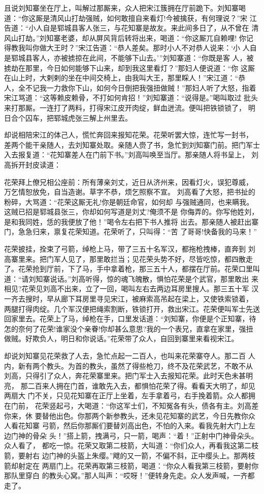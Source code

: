 且说刘知寨坐在厅上，叫解过那厮来，众人把宋江簇拥在厅前跪下。刘知寨喝
道：“你这厮是清风山打劫强贼，如何敢擅自来看灯!今被擒获，有何理说？”宋
江告道：“小人自是郓城县客人张三，与花知寨是故友。来此间多日了，从不曾在
清风山打劫。”刘知寨老婆，却从屏风背后转将出来，喝道：“你这厮兀自赖哩!
你记得教我叫你做大王时？”宋江告道：“恭人差矣。那时小人不对恭人说来：‘小
人自是郓城县客人，亦被掳掠在此间，不能够下山去。’”刘知寨道：“你既是客
人，被掳劫在那里，今日如何能够下山来，却到我这里看灯？”那妇人便说道：“你
这厮在山上时，大剌剌的坐在中间交椅上，由我叫大王，那里睬人！”宋江道：“恭
人，全不记我一力救你下山，如何今日倒把我强扭做贼！”那妇人听了大怒，指着
宋江骂道：“这等赖皮赖骨，不打如何肯招！”刘知寨道：“说得是。”喝叫取过
批头来打那厮。一连打了两料，打得宋江皮开肉绽，鲜血迸流。便叫把铁锁锁了，
明日合个囚车，把郓城虎张三解上州里去。

却说相陪宋江的体己人，慌忙奔回来报知花荣。花荣听罢大惊，连忙写一封书，
差两个能干亲随人，去刘知寨处取。亲随人赍了书，急忙到刘知寨门前。把门军士
入去报复道：“花知寨差人在门前下书。”刘高叫唤至当厅。那亲随人将书呈上，
刘高拆开封皮读道：

花荣拜上僚兄相公座前：所有薄亲刘丈，近日从济州来，因看灯火，误犯尊威，
万乞情恕放免，自当造谢。草字不恭，烦乞照察不宣。
刘高看了大怒，把书扯的粉碎，大骂道：“花荣这厮无礼!你是朝廷命官，如何却
与强贼通同，也来瞒我。这贼已招是郓城县张三，你却如何写道是刘丈?俺须不是
你侮弄的。你写他姓刘，是和我同姓，恁的我便放了他！”喝令左右把下书人推将
出去。那亲随人被赶出寨门，急急归来，禀复花荣知道。花荣听了，只叫得：“苦
了哥哥!快备我的马来！”

花荣披挂，拴束了弓箭，绰枪上马，带了三五十名军汉，都拖枪拽棒，直奔到
刘高寨里来。把门军人见了，那里敢拦当；见花荣头势不好，尽皆吃惊，都四散走
了。花荣抢到厅前，下了马，手中拿着枪，那三五十人，都摆在厅前。花荣口里叫
道：“请刘知寨说话。”刘高听得，惊的魂飞魄散，惧怕花荣是个武官，那里敢出
来相见?花荣见刘高不出来，立了一回，喝叫左右去两边耳房里搜人。那三五十军
汉一齐去搜时，早从廊下耳房里寻见宋江，被麻索高吊起在梁上，又使铁索锁着，
两腿打得肉绽。几个军汉便把绳索割断，铁锁打开，救出宋江。花荣便叫军士先送
回家里去。花荣上了马，绰枪在手，口里发话道：“刘知寨，你便是个正知寨，待
怎的奈何了花荣!谁家没个亲眷!你却甚么意思?我的一个表兄，直拿在家里，强扭
做贼。好欺负人，明日和你说话。”花荣带了众人，自回到寨里来看视宋江。

却说刘知寨见花荣救了人去，急忙点起一二百人，也叫来花荣寨夺人。那二百
人内，新有两个教头。为首的教头，虽然了得些枪刀，终不及花荣武艺，不敢不从
刘高，只得引了众人，奔花荣寨里来。把门军士入去报知花荣。此时天色未甚明亮，
那二百来人拥在门首，谁敢先入去，都惧怕花荣了得。看看天大明了，却见两扇大
门不关，只见花知寨在正厅上坐着，左手拿着弓，右手挽着箭。众人都拥在门前，
花荣竖起弓，大喝道：“你这军士们，不知冤各有头，债各有主。刘高差你来，休
要替他出色。你那两个新参教头，还未见花知寨的武艺，今日先教你众人看花知寨
弓箭，然后你那厮们要替刘高出色，不怕的入来。看我先射大门上左边门神的骨朵
头！”搭上箭，拽满弓，只一箭，喝声：“着！”正射中门神骨朵头。众人看了，
都吃一惊。花荣又取第二枝箭，大叫道：“你们众人，再看我这第二枝箭，要射右
边门神的头盔上朱缨。”飕的又一箭，不偏不斜，正中缨头上。那两枝箭却射定在
两扇门上。花荣再取第三枝箭，喝道：“你众人看我第三枝箭，要射你那队里穿白
的教头心窝。”那人叫声：“哎呀！”便转身先走。众人发声喊，一齐都走了。

